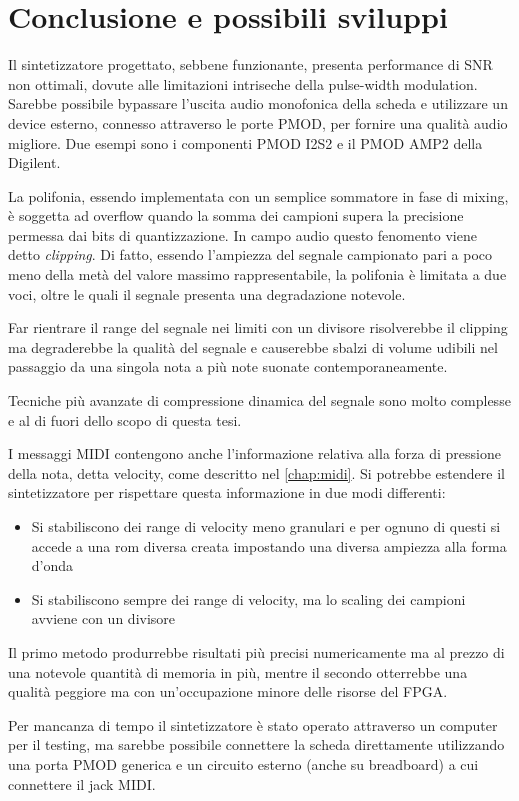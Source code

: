 \chapter{Conclusione e possibili sviluppi}

Il sintetizzatore progettato, sebbene funzionante, presenta performance
di SNR non ottimali, dovute alle limitazioni intriseche della pulse-width 
modulation.
Sarebbe possibile bypassare l'uscita audio monofonica della scheda
e utilizzare un device esterno, connesso attraverso le porte PMOD, 
per fornire una qualità audio migliore.
Due esempi sono i componenti PMOD I2S2 e il PMOD AMP2 della Digilent.

La polifonia, essendo implementata con un semplice sommatore in fase 
di mixing, è soggetta ad overflow quando la somma dei campioni supera
la precisione permessa dai  bits di quantizzazione.
In campo audio questo fenomento viene detto \textit{clipping}.
Di fatto, essendo l'ampiezza del segnale campionato pari a poco meno
della metà del valore massimo rappresentabile, la polifonia è limitata
a due voci, oltre le quali il segnale presenta una degradazione
notevole.

Far rientrare il range del segnale nei limiti con un divisore risolverebbe
il clipping ma degraderebbe la qualità del segnale e causerebbe
sbalzi di volume udibili nel passaggio da una singola nota  a più note
suonate contemporaneamente.

Tecniche più avanzate di compressione dinamica del segnale 
sono molto complesse e al di fuori dello scopo di questa tesi.  

I messaggi MIDI contengono anche l'informazione relativa alla forza
di pressione della nota, detta velocity, come descritto nel \cref{chap:midi}.
Si potrebbe estendere il sintetizzatore per rispettare questa informazione
in due modi differenti:
\begin{itemize}
  \item Si stabiliscono dei range di velocity meno granulari  e per ognuno
        di questi si accede a una rom diversa creata impostando una diversa 
        ampiezza alla forma d'onda
  \item Si stabiliscono sempre dei range di velocity, ma lo scaling dei
        campioni avviene con un divisore
\end{itemize}
Il primo metodo produrrebbe risultati più precisi numericamente ma al
prezzo di una notevole quantità di memoria in più, mentre il secondo
otterrebbe una qualità peggiore ma con un'occupazione minore delle
risorse del FPGA.

Per mancanza di tempo il sintetizzatore è stato operato attraverso un 
computer per il testing, ma sarebbe possibile connettere la scheda
direttamente utilizzando una porta PMOD generica e un circuito esterno
(anche su breadboard) a cui connettere il jack MIDI.
